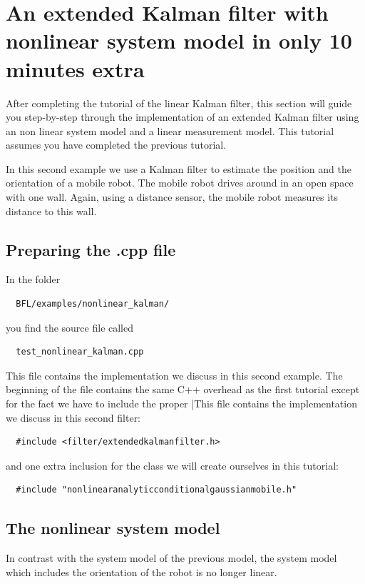 \documentclass[a4paper,10pt]{report}
\begin{document}

\pagebreak
\section{An extended Kalman filter with nonlinear system model in only
  10 minutes extra}
After completing the tutorial of the linear Kalman filter, this
section will guide you step-by-step through the implementation of an
extended Kalman filter using an non linear system model and a linear
measurement model. This tutorial assumes you have completed the
previous tutorial.

In this second example we use a Kalman filter to estimate the position
and the orientation of a mobile robot. The mobile robot drives around
in an open space with one wall. Again, using a distance sensor, the
mobile robot measures its distance to this wall.

\subsection{Preparing the .cpp file}
In the folder 
\begin{verbatim}
  BFL/examples/nonlinear_kalman/
\end{verbatim}
you find the source file called 
\begin{verbatim}
  test_nonlinear_kalman.cpp
\end{verbatim}
This file contains the implementation we discuss in this second
example. The beginning of the file contains the same C++ overhead as
the first tutorial except for the fact we have to include the proper
|This file contains the implementation we discuss in this second
filter:
\begin{verbatim}
  #include <filter/extendedkalmanfilter.h>
\end{verbatim}
and one extra inclusion for the class we will create ourselves in this
tutorial:
\begin{verbatim}
  #include "nonlinearanalyticconditionalgaussianmobile.h"
\end{verbatim}



\subsection{The nonlinear system model}
In contrast with the system model of the previous model, the system
model which includes the orientation of the robot is no longer
linear.
\end{document}
